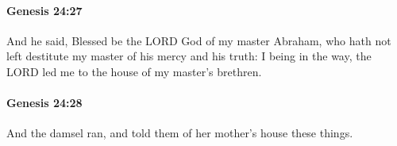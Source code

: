 		\paragraph{Genesis 24:27} %
			\label{GENESIS-24-27}

			And he said, Blessed be the LORD God of my master Abraham, who hath not left destitute my master of his mercy and his truth: I being in the way, the LORD led me to the house of my master's brethren.


		\paragraph{Genesis 24:28} %
			\label{GENESIS-24-28}

			And the damsel ran, and told them of her mother's house these things.


